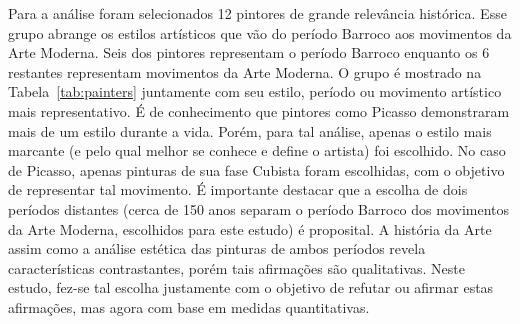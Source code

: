 Para a análise foram selecionados 12 pintores de grande relevância
histórica. Esse grupo abrange os estilos artísticos que vão do período
Barroco aos movimentos da Arte Moderna. Seis dos pintores representam
o período Barroco enquanto os 6 restantes representam movimentos da
Arte Moderna. O grupo é mostrado na Tabela~\ref{tab:painters}
juntamente com seu estilo, período ou movimento artístico mais
representativo. É de conhecimento que pintores como Picasso
demonstraram mais de um estilo durante a vida. Porém, para tal
análise, apenas o estilo mais marcante (e pelo qual melhor se conhece
e define o artista) foi escolhido. No caso de Picasso, apenas pinturas
de sua fase Cubista foram escolhidas, com o objetivo de representar
tal movimento. É importante destacar que a escolha de dois períodos
distantes (cerca de 150 anos separam o período Barroco dos movimentos
da Arte Moderna, escolhidos para este estudo) é proposital. A história
da Arte assim como a análise estética das pinturas de ambos períodos
revela características contrastantes, porém tais afirmações são
qualitativas. Neste estudo, fez-se tal escolha justamente com o
objetivo de refutar ou afirmar estas afirmações, mas agora com base em
medidas quantitativas.


